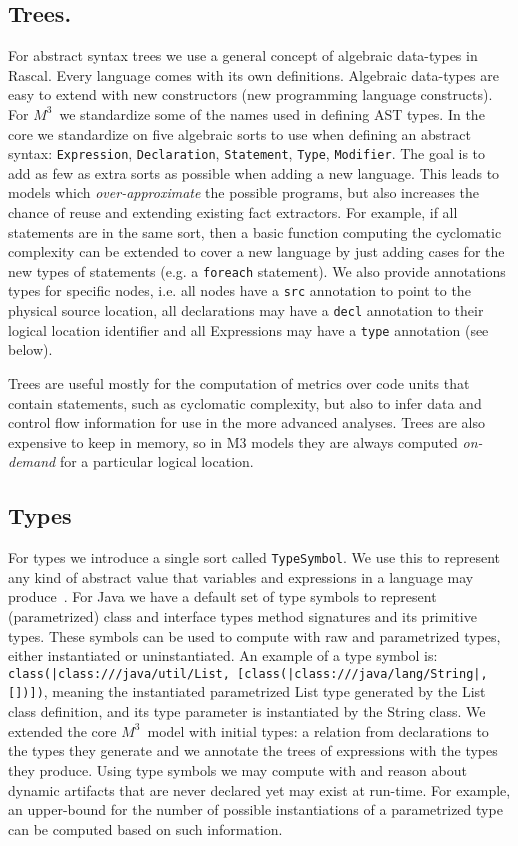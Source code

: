\documentclass[conference]{IEEEtran}
\newcommand{\loc}[1]{\small{\texttt{#1}}\xspace}
\newcommand{\mthree}{\ensuremath{M^3}\xspace}
\begin{document}
\subsection{Trees.} For abstract syntax trees we use a general concept of
algebraic data-types in Rascal. Every language comes with its own definitions.
Algebraic data-types are easy to extend with new constructors (new programming
language constructs). For \mthree\ we standardize some of the names used in
defining AST types. In the core we standardize on five algebraic sorts to use
when defining an abstract syntax: \texttt{Expression}, \texttt{Declaration},
\texttt{Statement}, \texttt{Type}, \texttt{Modifier}. The goal is to add as
few as extra sorts as possible when adding a new language. This leads to
models which \emph{over-approximate} the possible programs, but also increases
the chance of reuse and extending existing fact extractors. For example, if
all statements are in the same sort, then a basic function computing the
cyclomatic complexity can be extended to cover a new language by just adding
cases for the new types of statements (e.g. a \texttt{foreach} statement). We
also provide annotations types for specific nodes, i.e. all nodes have a
\texttt{src} annotation to point to the physical source location, all
declarations may have a \texttt{decl} annotation to their logical location
identifier and all Expressions may have a \texttt{type} annotation (see
below).

Trees are useful mostly for the computation of metrics over code units that
contain statements, such as cyclomatic complexity, but also to infer data and
control flow information for use in the more advanced analyses. Trees are also
expensive to keep in memory, so in M3 models they are always computed \emph
{on-demand} for a particular logical location.

\subsection{Types} For types we introduce a single sort called
\texttt{TypeSymbol}. We use this to represent any kind of abstract value that
variables and expressions in a language may produce~\cite{abstractinterpretation}. For Java we have a
default set of type symbols to represent (parametrized) class and interface
types method signatures and its primitive types. These symbols can be used to
compute with raw and parametrized types, either instantiated or
uninstantiated. An example of a type symbol is:
\loc{class(|class:///java/util/List, [class(|class:///java/lang/String|,[])])}, meaning the instantiated
parametrized List type generated by the List class definition, and its type
parameter is instantiated by the String class. We extended the core \mthree\
model with initial types: a relation from declarations to the types they
generate and we annotate the trees of expressions with the types they produce.
Using type symbols we may compute with and reason about dynamic artifacts that
are never declared yet may exist at run-time. For example, an upper-bound for the
number of possible instantiations of a parametrized type can be computed based
on such information.
\end{document}
